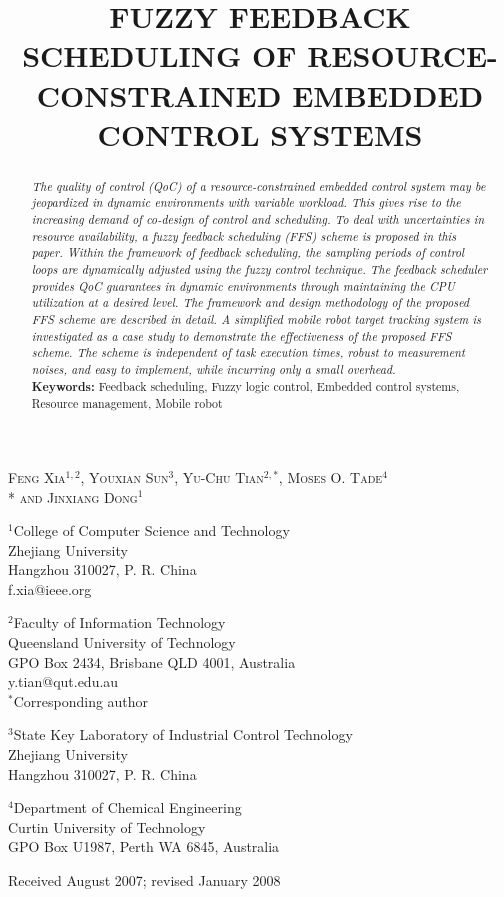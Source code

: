 \documentclass[12pt,a4paper]{ijicic}
\title{}
\title[FUZZY FEEDBACK SCHEDULING OF EMBEDDED CONTROL SYSTEMS]
      {FUZZY FEEDBACK SCHEDULING OF RESOURCE-CONSTRAINED EMBEDDED CONTROL SYSTEMS}
\author[F. Xia, Y. Sun, Y.-C. Tian, M. O. Tade and J. Dong]
\author[F. Xia, Y. Sun, Y.-C. Tian, M. O. Tade and J. Dong]{}
\begin{document}
\maketitle

\begin{center}
\normalsize{\scshape Feng Xia$^{1,2}$, Youxian Sun$^3$, Yu-Chu
Tian$^{2,*}$, Moses O. Tade$^4$ \\* and Jinxiang Dong$^1$}
\footnotesize\rmfamily
\medskip

$^1$College of Computer Science and Technology\\
Zhejiang University\\
Hangzhou 310027, P. R. China\\
f.xia@ieee.org
\medskip

$^2$Faculty of Information Technology \\
Queensland University of Technology\\
GPO Box 2434, Brisbane QLD 4001, Australia\\
y.tian@qut.edu.au\\
$^*$Corresponding author
\medskip

$^3$State Key Laboratory of Industrial Control Technology\\
Zhejiang University\\
Hangzhou 310027, P. R. China
\medskip

$^4$Department of Chemical Engineering\\
Curtin University of Technology\\
GPO Box U1987, Perth WA 6845, Australia

\end{center}

\medskip
\centerline{\textsf{Received August 2007; revised January 2008}}
\medskip


\begin{abstract}
{\em The quality of control (QoC) of a resource-constrained embedded
control system may be jeopardized in dynamic environments with
variable workload. This gives rise to the increasing demand of
co-design of control and scheduling. To deal with uncertainties in
resource availability, a fuzzy feedback scheduling (FFS) scheme is
proposed in this paper. Within the framework of feedback scheduling,
the sampling periods of control loops are dynamically adjusted using
the fuzzy control technique. The feedback scheduler provides QoC
guarantees in dynamic environments through maintaining the CPU
utilization at a desired level. The framework and design methodology
of the proposed FFS scheme are described in detail. A simplified
mobile robot target tracking system is investigated as a case study
to demonstrate the effectiveness of the proposed FFS scheme. The
scheme is independent of task execution times, robust to measurement
noises, and easy to implement, while incurring only a small
overhead.}\\
{\bf Keywords:} Feedback scheduling, Fuzzy logic control, Embedded
control systems, Resource management, Mobile robot
\end{abstract}
\end{document}
